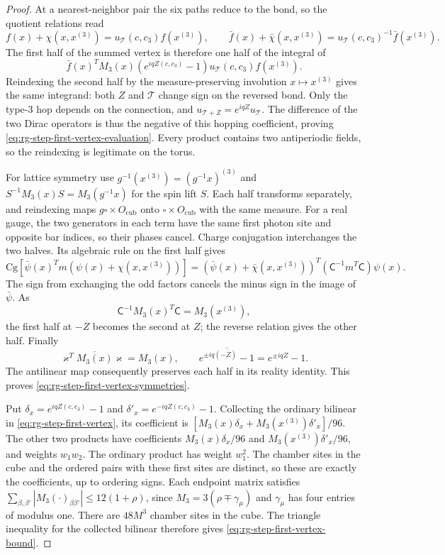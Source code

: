 \documentclass[11pt,letterpaper,reqno]{amsart}
\begin{document}
\begin{proof}
At a nearest-neighbor pair the six paths reduce to
the bond, so the quotient relations read
\[
 f(x)+\chi(x,x^{(3)})=u_{\mathscr T}(c,c_3)f(x^{(3)}),
 \qquad
 \bar f(x)+\bar\chi(x,x^{(3)})
                         =u_{\mathscr T}(c,c_3)^{-1}\bar f(x^{(3)}).
\]
The first half of the summed vertex is therefore
one half of the integral of
\[
 \bar f(x)^TM_3(x)(e^{iqZ(c,c_3)}-1)
                                  u_{\mathscr T}(c,c_3)f(x^{(3)}).
\]
Reindexing the second half by the measure-preserving
involution $x\mapsto x^{(3)}$ gives the same
integrand: both $Z$ and $\mathscr T$ change sign
on the reversed bond. Only the type-$3$ hop
depends on the connection, and
$u_{\mathscr T+Z}=e^{iqZ}u_{\mathscr T}$.
The difference of the two Dirac operators is
thus the negative of this hopping coefficient,
proving \eqref{eq:rg-step-first-vertex-evaluation}.
Every product contains two antiperiodic fields,
so the reindexing is legitimate on the torus.

For lattice symmetry use
$g^{-1}(x^{(3)})=(g^{-1}x)^{(3)}$ and
$S^{-1}M_3(x)S=M_3(g^{-1}x)$ for the spin
lift $S$. Each half transforms separately, and
reindexing maps $g\square\times O_{\mathrm{cub}}$
onto $\square\times O_{\mathrm{cub}}$ with the
same measure. For a real gauge, the two generators
in each term have the same first photon site and
opposite bar indices, so their phases cancel.
Charge conjugation interchanges the two halves.
Its algebraic rule on the first half gives
\[
 \mathrm{Cg}[\bar\psi(x)^Tm(\psi(x)+\chi(x,x^{(3)}))]
       =(\bar\psi(x)+\bar\chi(x,x^{(3)}))^T
                              (\mathsf C^{-1}m^T\mathsf C)\psi(x).
\]
The sign from exchanging the odd factors cancels
the minus sign in the image of $\bar\psi$.
As
\[
 \mathsf C^{-1}M_3(x)^T\mathsf C=M_3(x^{(3)}),
\]
the first half at $-Z$ becomes the second at $Z$;
the reverse relation gives the other half.
Finally
\[
 \varkappa^T\overline{M_3(x)}\varkappa=M_3(x),\qquad
 \overline{e^{\pm iq(-\overline Z)}-1}=e^{\pm iqZ}-1.
\]
The antilinear map consequently preserves each
half in its reality identity. This proves
\eqref{eq:rg-step-first-vertex-symmetries}.

Put $\delta_x=e^{iqZ(c,c_3)}-1$ and
$\delta'_x=e^{-iqZ(c,c_3)}-1$. Collecting the
ordinary bilinear in \eqref{eq:rg-step-first-vertex},
its coefficient is
$[M_3(x)\delta_x+M_3(x^{(3)})\delta'_x]/96$.
The other two products have coefficients
$M_3(x)\delta_x/96$ and
$M_3(x^{(3)})\delta'_x/96$, and weights
$w_1w_2$.
The ordinary product has weight $w_1^2$.
The chamber sites in the cube and the ordered
pairs with these first sites are distinct, so
these are exactly the coefficients, up to
ordering signs. Each endpoint matrix satisfies
$\sum_{\beta,\beta'}|M_3(\cdot)_{\beta\beta'}|
\le12(1+\rho)$, since
$M_3=3(\rho\mp\gamma_\mu)$ and $\gamma_\mu$
has four entries of modulus one.
There are $48M^3$ chamber sites in the cube.
The triangle inequality for the collected
bilinear therefore gives
\eqref{eq:rg-step-first-vertex-bound}.


\end{proof}
\end{document}
